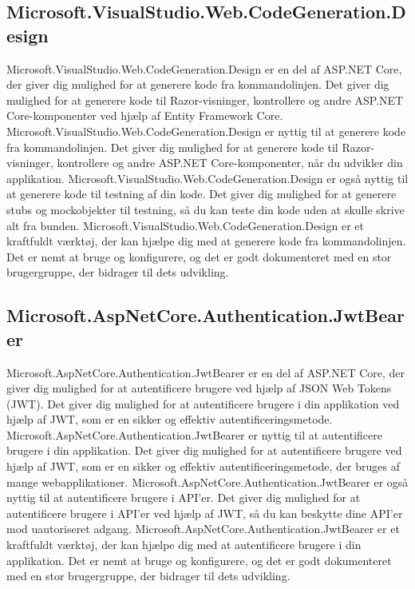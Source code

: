 \subsection{Microsoft.VisualStudio.Web.CodeGeneration.Design}
Microsoft.VisualStudio.Web.CodeGeneration.Design er en del af ASP.NET Core, der giver dig mulighed for at generere kode fra kommandolinjen. Det giver dig mulighed for at generere kode til Razor-visninger, kontrollere og andre ASP.NET Core-komponenter ved hjælp af Entity Framework Core.
Microsoft.VisualStudio.Web.CodeGeneration.Design er nyttig til at generere kode fra kommandolinjen. Det giver dig mulighed for at generere kode til Razor-visninger, kontrollere og andre ASP.NET Core-komponenter, når du udvikler din applikation.
Microsoft.VisualStudio.Web.CodeGeneration.Design er også nyttig til at generere kode til testning af din kode. Det giver dig mulighed for at generere stubs og mockobjekter til testning, så du kan teste din kode uden at skulle skrive alt fra bunden.
Microsoft.VisualStudio.Web.CodeGeneration.Design er et kraftfuldt værktøj, der kan hjælpe dig med at generere kode fra kommandolinjen. Det er nemt at bruge og konfigurere, og det er godt dokumenteret med en stor brugergruppe, der bidrager til dets udvikling.

\subsection{Microsoft.AspNetCore.Authentication.JwtBearer}
Microsoft.AspNetCore.Authentication.JwtBearer er en del af ASP.NET Core, der giver dig mulighed for at autentificere brugere ved hjælp af JSON Web Tokens (JWT). Det giver dig mulighed for at autentificere brugere i din applikation ved hjælp af JWT, som er en sikker og effektiv autentificeringsmetode.
Microsoft.AspNetCore.Authentication.JwtBearer er nyttig til at autentificere brugere i din applikation. Det giver dig mulighed for at autentificere brugere ved hjælp af JWT, som er en sikker og effektiv autentificeringsmetode, der bruges af mange webapplikationer.
Microsoft.AspNetCore.Authentication.JwtBearer er også nyttig til at autentificere brugere i API'er. Det giver dig mulighed for at autentificere brugere i API'er ved hjælp af JWT, så du kan beskytte dine API'er mod uautoriseret adgang.
Microsoft.AspNetCore.Authentication.JwtBearer er et kraftfuldt værktøj, der kan hjælpe dig med at autentificere brugere i din applikation. Det er nemt at bruge og konfigurere, og det er godt dokumenteret med en stor brugergruppe, der bidrager til dets udvikling.

